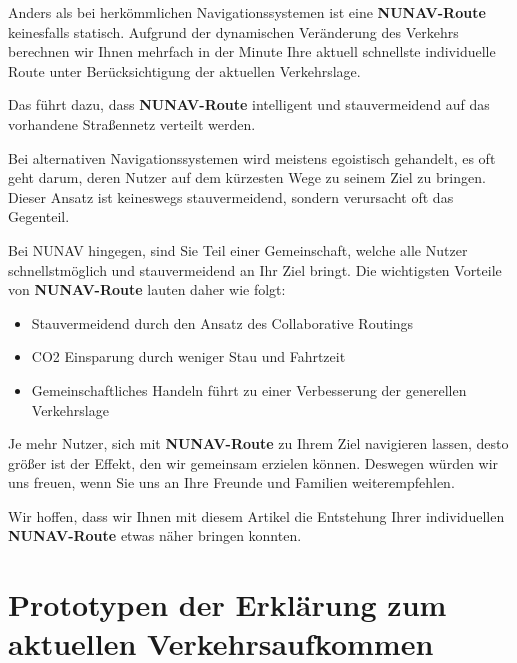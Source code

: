 \noindent Anders als bei herkömmlichen Navigationssystemen ist eine \textbf{NUNAV-Route} keinesfalls statisch. Aufgrund der dynamischen Veränderung des Verkehrs berechnen wir Ihnen mehrfach in der Minute Ihre aktuell schnellste individuelle Route unter Berücksichtigung der aktuellen Verkehrslage.

\smallskip

\noindent Das führt dazu, dass \textbf{NUNAV-Route} intelligent und stauvermeidend auf das vorhandene Straßennetz verteilt werden.

\smallskip

\noindent Bei alternativen Navigationssystemen wird meistens egoistisch gehandelt, es oft geht darum, deren Nutzer auf dem kürzesten Wege zu seinem Ziel zu bringen. Dieser Ansatz ist keineswegs stauvermeidend, sondern verursacht oft das Gegenteil.

\smallskip

\noindent Bei NUNAV hingegen, sind Sie Teil einer Gemeinschaft, welche alle Nutzer schnellstmöglich und stauvermeidend an Ihr Ziel bringt. Die wichtigsten Vorteile von \textbf{NUNAV-Route} lauten daher wie folgt:

\begin{itemize}
    \item Stauvermeidend durch den Ansatz des Collaborative Routings
    \item CO2 Einsparung durch weniger Stau und Fahrtzeit
    \item Gemeinschaftliches Handeln führt zu einer Verbesserung der generellen Verkehrslage
\end{itemize}

\noindent Je mehr Nutzer, sich mit \textbf{NUNAV-Route} zu Ihrem Ziel navigieren lassen, desto größer ist der Effekt, den wir gemeinsam erzielen können. Deswegen würden wir uns freuen, wenn Sie uns an Ihre Freunde und Familien weiterempfehlen.

\smallskip

\noindent Wir hoffen, dass wir Ihnen mit diesem Artikel die Entstehung Ihrer individuellen \textbf{NUNAV-Route} etwas näher bringen konnten.

\newpage

\section*{Prototypen der Erklärung zum aktuellen Verkehrsaufkommen}
\label{sec:appendix_traffic_volume}

